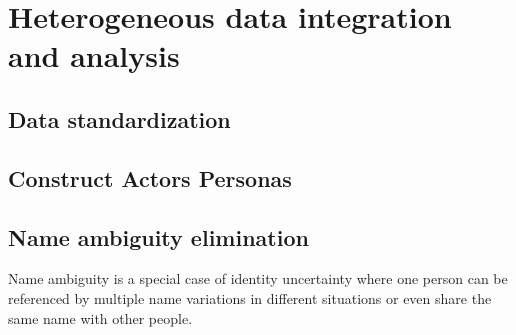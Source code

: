 \section{Heterogeneous data {}integration and analysis}
\subsection{Data standardization}
\subsection{Construct Actors Personas}
\subsection{Name ambiguity elimination}
Name ambiguity is a special case of identity uncertainty where one person can be referenced by multiple name variations in different situations or even share the same name with other people. 